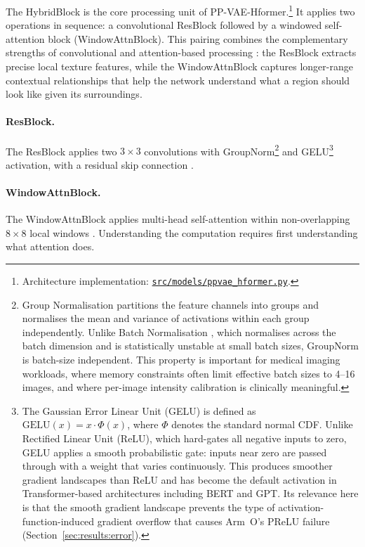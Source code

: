 \documentclass[12pt, a4paper, twoside, openright]{book}
\begin{document}
The HybridBlock is the core processing unit of PP-VAE-Hformer.\footnote{Architecture implementation: \href{https://github.com/teklesam/ppva_hformer_codebase/blob/main/src/models/ppvae_hformer.py}{\texttt{src/models/ppvae\_hformer.py}}.} It applies two operations
in sequence: a convolutional ResBlock followed by a windowed self-attention block
(WindowAttnBlock). This pairing combines the complementary strengths of convolutional
and attention-based processing \cite{zhang_hformer_2023}: the ResBlock extracts precise
local texture features, while the WindowAttnBlock captures longer-range contextual
relationships that help the network understand what a region should look like given its
surroundings.

\paragraph{ResBlock.}
The ResBlock applies two $3 \times 3$ convolutions with GroupNorm\footnote{Group Normalisation \cite{wu_group_2018} partitions the feature channels into groups and normalises the mean and variance of activations within each group independently. Unlike Batch Normalisation \cite{ioffe_batch_2015}, which normalises across the batch dimension and is statistically unstable at small batch sizes, GroupNorm is batch-size independent. This property is important for medical imaging workloads, where memory constraints often limit effective batch sizes to 4--16 images, and where per-image intensity calibration is clinically meaningful.} and GELU\footnote{The Gaussian Error Linear Unit (GELU) \cite{hendrycks_gaussian_2016} is defined as $\mathrm{GELU}(x) = x \cdot \Phi(x)$, where $\Phi$ denotes the standard normal CDF. Unlike Rectified Linear Unit (ReLU), which hard-gates all negative inputs to zero, GELU applies a smooth probabilistic gate: inputs near zero are passed through with a weight that varies continuously. This produces smoother gradient landscapes than ReLU and has become the default activation in Transformer-based architectures including BERT \cite{devlin_bert_2019} and GPT. Its relevance here is that the smooth gradient landscape prevents the type of activation-function-induced gradient overflow that causes Arm~O's PReLU failure (Section~\ref{sec:results:error}).} activation, with a residual skip connection \cite{he_deep_2016}.



\paragraph{WindowAttnBlock.}
The WindowAttnBlock applies multi-head self-attention within non-overlapping $8\times8$ local windows \cite{liu_swin_2021, zhang_hformer_2023}. Understanding the computation requires first understanding what attention does.
\end{document}
